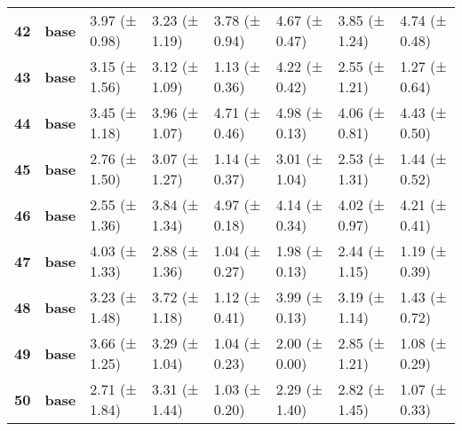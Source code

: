 \begin{longtable}{llllllll}
\cline{1-8}
\textbf{42} & \textbf{base} & 3.97 (± 0.98) & 3.23 (± 1.19) & 3.78 (± 0.94) & 4.67 (± 0.47) & 3.85 (± 1.24) & 4.74 (± 0.48) \\
\cline{1-8}
\textbf{43} & \textbf{base} & 3.15 (± 1.56) & 3.12 (± 1.09) & 1.13 (± 0.36) & 4.22 (± 0.42) & 2.55 (± 1.21) & 1.27 (± 0.64) \\
\cline{1-8}
\textbf{44} & \textbf{base} & 3.45 (± 1.18) & 3.96 (± 1.07) & 4.71 (± 0.46) & 4.98 (± 0.13) & 4.06 (± 0.81) & 4.43 (± 0.50) \\
\cline{1-8}
\textbf{45} & \textbf{base} & 2.76 (± 1.50) & 3.07 (± 1.27) & 1.14 (± 0.37) & 3.01 (± 1.04) & 2.53 (± 1.31) & 1.44 (± 0.52) \\
\cline{1-8}
\textbf{46} & \textbf{base} & 2.55 (± 1.36) & 3.84 (± 1.34) & 4.97 (± 0.18) & 4.14 (± 0.34) & 4.02 (± 0.97) & 4.21 (± 0.41) \\
\cline{1-8}
\textbf{47} & \textbf{base} & 4.03 (± 1.33) & 2.88 (± 1.36) & 1.04 (± 0.27) & 1.98 (± 0.13) & 2.44 (± 1.15) & 1.19 (± 0.39) \\
\cline{1-8}
\textbf{48} & \textbf{base} & 3.23 (± 1.48) & 3.72 (± 1.18) & 1.12 (± 0.41) & 3.99 (± 0.13) & 3.19 (± 1.14) & 1.43 (± 0.72) \\
\cline{1-8}
\textbf{49} & \textbf{base} & 3.66 (± 1.25) & 3.29 (± 1.04) & 1.04 (± 0.23) & 2.00 (± 0.00) & 2.85 (± 1.21) & 1.08 (± 0.29) \\
\cline{1-8}
\textbf{50} & \textbf{base} & 2.71 (± 1.84) & 3.31 (± 1.44) & 1.03 (± 0.20) & 2.29 (± 1.40) & 2.82 (± 1.45) & 1.07 (± 0.33) \\
\cline{1-8}
\end{longtable}
